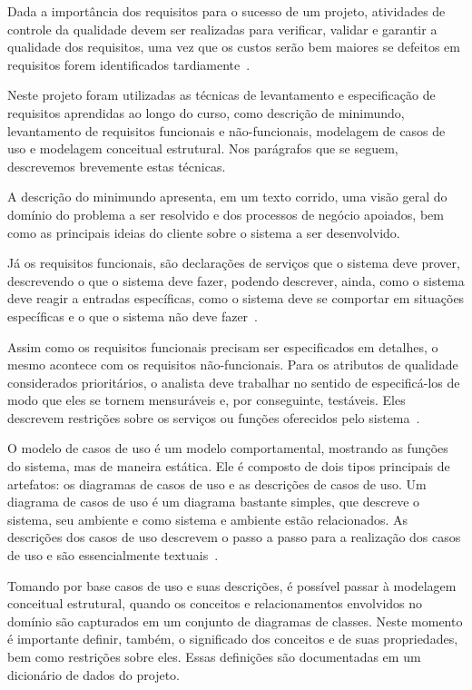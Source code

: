 Dada a importância dos requisitos para o sucesso de um projeto, atividades de controle da qualidade devem ser realizadas para verificar, validar e garantir a qualidade dos requisitos, uma vez que os custos serão bem maiores se defeitos em requisitos forem identificados tardiamente~\cite{falboEngReq}.

Neste projeto foram utilizadas as técnicas de levantamento e especificação de requisitos aprendidas ao longo do curso, como descrição de minimundo, levantamento de requisitos funcionais e não-funcionais, modelagem de casos de uso e modelagem conceitual estrutural. Nos parágrafos que se seguem, descrevemos brevemente estas técnicas.

A descrição do minimundo apresenta, em um texto corrido, uma visão geral do domínio do problema a ser resolvido e dos processos de negócio apoiados, bem como as principais ideias do cliente sobre o sistema a ser desenvolvido.

Já os requisitos funcionais, são declarações de serviços que o sistema deve prover, descrevendo o que o sistema deve fazer, podendo descrever, ainda, como o sistema deve reagir a entradas específicas, como o sistema deve se comportar em situações específicas e o que o sistema não deve fazer~\cite{sommerville}.

Assim como os requisitos funcionais precisam ser especificados em detalhes, o mesmo acontece com os requisitos não-funcionais. Para os atributos de qualidade considerados prioritários, o analista deve trabalhar no sentido de especificá-los de modo que eles se tornem mensuráveis e, por conseguinte, testáveis. Eles descrevem restrições sobre os serviços ou funções oferecidos pelo sistema~\cite{sommerville}.

O modelo de casos de uso é um modelo comportamental, mostrando as funções do sistema, mas de maneira estática. Ele é composto de dois tipos principais de artefatos: os diagramas de casos de uso e as descrições de casos de uso. Um diagrama de casos de uso é um diagrama bastante simples, que descreve o sistema, seu ambiente e como sistema e ambiente estão relacionados. As descrições dos casos de uso descrevem o passo a passo para a realização dos casos de uso e são essencialmente textuais~\cite{falboEngReq}. 

Tomando por base casos de uso e suas descrições, é possível passar à modelagem conceitual estrutural, quando os conceitos e relacionamentos envolvidos no domínio são capturados em um conjunto de diagramas de classes. Neste momento é importante definir, também, o significado dos conceitos e de suas propriedades, bem como restrições sobre eles. Essas definições são documentadas em um dicionário de dados do projeto.

